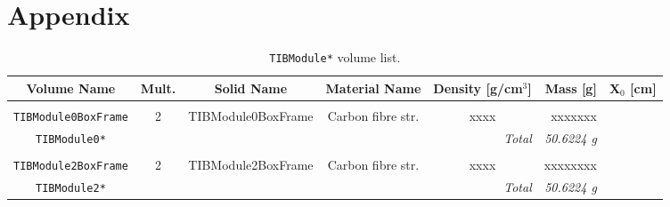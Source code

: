 \documentclass{cmspaper}
\begin{document}
\section{Appendix}

\begin{sidewaystable}[p]
  \caption{{\tt TIBModule*} volume list.}
  \label{tab:tib_module}
  \begin{center}
    \begin{tabular}{cccccrr}
         Volume Name                   & Mult. & Solid Name                    & Material Name         & Density [g/cm$^3$]    & Mass [g] & X$_0$ [cm]     \\ 
	 \hline \\
         {\tt TIBModule0BoxFrame}     & 2     & TIBModule0BoxFrame            & Carbon fibre str.     & xxxx          & xxxxxxx   &   \\
	 {\tt TIBModule0*}             &  \multicolumn{4}{r}{\em Total } & {\em  50.6224 g} & \\
	 \hline  \\
         {\tt TIBModule2BoxFrame}     & 2     & TIBModule2BoxFrame            & Carbon fibre str.     & xxxx          & xxxxxxxx  &   \\
	 {\tt TIBModule2*}             &  \multicolumn{4}{r}{\em Total } & {\em  50.6224 g} & \\
	 \hline
    \end{tabular}
  \end{center}
\end{sidewaystable}
\end{document}
